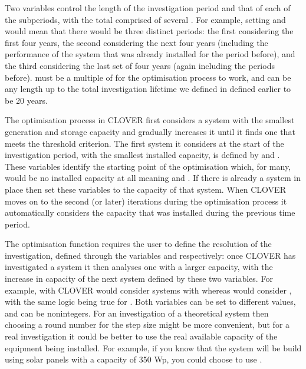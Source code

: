 \documentclass[letterpaper,10pt,english]{sphinxmanual}
\begin{document}
\sphinxAtStartPar
Two variables control the length of the investigation period and that of
each of the sub\sphinxhyphen{}periods, with the total  comprised of
several . For example, setting
 and  would mean that
there would be three distinct periods: the first considering the first
four years, the second considering the next four years (including the
performance of the system that was already installed for the period
before), and the third considering the last set of four years (again
including the periods before).  must be a multiple of
 for the optimisation process to work, and
 can be any length up to the total investigation
lifetime we defined in defined earlier to be 20 years.

\sphinxAtStartPar
The optimisation process in CLOVER first considers a system with the
smallest generation and storage capacity and gradually increases it
until it finds one that meets the threshold criterion. The first system
it considers at the start of the investigation period, with the smallest
installed capacity, is defined by  and
. These variables identify the starting point of
the optimisation which, for many, would be no installed capacity at all
\sphinxhyphen{} meaning  and . If there
is already a system in place then set these variables to the capacity of
that system. When CLOVER moves on to the second (or later) iterations
during the optimisation process it automatically considers the capacity
that was installed during the previous time period.

\sphinxAtStartPar
The optimisation function requires the user to define the resolution of
the investigation, defined through the variables  and
 respectively: once CLOVER has investigated a
system it then analyses one with a larger capacity, with the increase in
capacity of the next system defined by these two variables. For example,
with  CLOVER would consider systems with
 whereas  would
consider , with the same logic being true
for . Both variables can be set to different
values, and can be non\sphinxhyphen{}integers. For an investigation of a theoretical
system then choosing a round number for the step size might be more
convenient, but for a real investigation it could be better to use the
real available capacity of the equipment being installed. For example,
if you know that the system will be build using solar panels with a
capacity of 350 Wp, you could choose to use .
\end{document}
